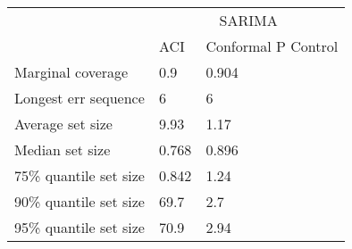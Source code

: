 \begin{tabular}{lll}
\toprule
& \multicolumn{2}{c}{SARIMA} \\
& ACI & Conformal P Control \\
\midrule
Marginal coverage & 0.9 & 0.904 \\
Longest err sequence & 6 & 6 \\
Average set size & 9.93 & 1.17 \\
Median set size & 0.768 & 0.896 \\
75\% quantile set size & 0.842 & 1.24 \\
90\% quantile set size & 69.7 & 2.7 \\
95\% quantile set size & 70.9 & 2.94 \\
\bottomrule
\end{tabular}
